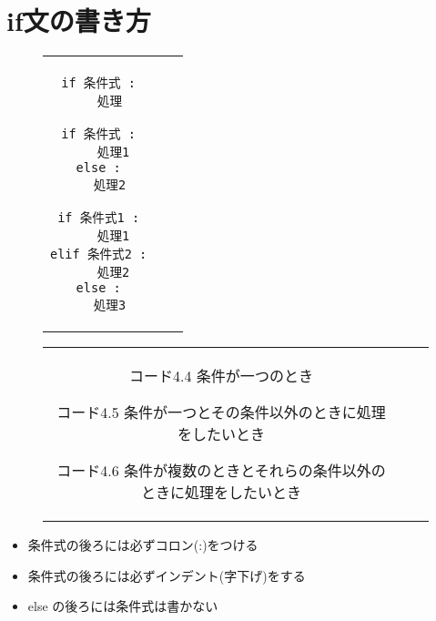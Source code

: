 \documentclass[dvipdfmx]{jsbook}
\begin{document}
\section{if文の書き方}
\begin{figure}[htp]
	\begin{tabular}{ccc}
		\begin{minipage}[t]{.3\textwidth}
			\begin{lstlisting}[caption=if 文の基本構文-その1]
if 条件式 :
	処理 \end{lstlisting}
		\end{minipage}
		\begin{minipage}[t]{.3\textwidth}
			\begin{lstlisting}[caption=if 文の基本構文-その2]
if 条件式 :
	処理1
else :
	処理2 \end{lstlisting}
		\end{minipage}
		\begin{minipage}[t]{.3\textwidth}
			\begin{lstlisting}[caption=if 文の基本構文-その3]
if 条件式1 :
	処理1
elif 条件式2 :
	処理2
else :
	処理3 \end{lstlisting}
		\end{minipage}
	\end{tabular}
\end{figure}
\vspace{-10truemm}
\begin{figure}[htp]
	\begin{tabular}{ccc} \hspace{3truemm}
		\begin{minipage}[t]{.28\textwidth}
			\begin{itembox}[l]{コード4.4}
				条件が一つのとき
			\end{itembox}
		\end{minipage}
		\begin{minipage}[t]{.3\textwidth}
			\begin{itembox}[l]{コード4.5}
				条件が一つとその条件以外のときに処理をしたいとき
			\end{itembox}
		\end{minipage}
		\begin{minipage}[t]{.33\textwidth}
			\begin{itembox}[l]{コード4.6}
				条件が複数のときとそれらの条件以外のときに処理をしたいとき
			\end{itembox}
		\end{minipage}
	\end{tabular}
\end{figure}
\begin{tcolorbox}[colframe=red!75!black, colback=red!10!white, coltitle=white, fonttitle=\bfseries,
		title=注意]
	\begin{itemize}
		\item 条件式の後ろには必ずコロン(:)をつける
		\item 条件式の後ろには必ずインデント(字下げ)をする
		\item else の後ろには条件式は書かない
	\end{itemize}
\end{tcolorbox}
\end{document}
